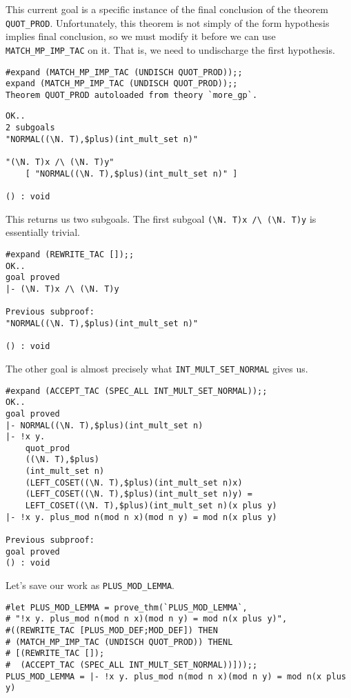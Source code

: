This current goal is a specific instance of the final conclusion of
the theorem {\small\verb+QUOT_PROD+}.  Unfortunately, this theorem is
not simply of the form hypothesis implies final conclusion, so we must
modify it before we can use {\small\verb+MATCH_MP_IMP_TAC+} on it.
That is, we need to undischarge the first hypothesis.
\begin{session}
\begin{verbatim}
#expand (MATCH_MP_IMP_TAC (UNDISCH QUOT_PROD));;
expand (MATCH_MP_IMP_TAC (UNDISCH QUOT_PROD));;
Theorem QUOT_PROD autoloaded from theory `more_gp`.
\end{verbatim}
\mvdots
\begin{verbatim}
OK..
2 subgoals
"NORMAL((\N. T),$plus)(int_mult_set n)"

"(\N. T)x /\ (\N. T)y"
    [ "NORMAL((\N. T),$plus)(int_mult_set n)" ]

() : void
\end{verbatim}
\end{session}

This returns us two subgoals.  The first subgoal 
{\small\verb+(\N. T)x /\ (\N. T)y+} is essentially trivial.
\begin{session}
\begin{verbatim}
#expand (REWRITE_TAC []);;
OK..
goal proved
|- (\N. T)x /\ (\N. T)y

Previous subproof:
"NORMAL((\N. T),$plus)(int_mult_set n)"

() : void
\end{verbatim}
\end{session}
The other goal is almost precisely what
{\small\verb+INT_MULT_SET_NORMAL+} gives us.
\begin{session}
\begin{verbatim}
#expand (ACCEPT_TAC (SPEC_ALL INT_MULT_SET_NORMAL));;
OK..
goal proved
|- NORMAL((\N. T),$plus)(int_mult_set n)
|- !x y.
    quot_prod
    ((\N. T),$plus)
    (int_mult_set n)
    (LEFT_COSET((\N. T),$plus)(int_mult_set n)x)
    (LEFT_COSET((\N. T),$plus)(int_mult_set n)y) =
    LEFT_COSET((\N. T),$plus)(int_mult_set n)(x plus y)
|- !x y. plus_mod n(mod n x)(mod n y) = mod n(x plus y)

Previous subproof:
goal proved
() : void
\end{verbatim}
\end{session}

Let's save our work as {\small\verb+PLUS_MOD_LEMMA+}.
\begin{session}
\begin{verbatim}
#let PLUS_MOD_LEMMA = prove_thm(`PLUS_MOD_LEMMA`,
# "!x y. plus_mod n(mod n x)(mod n y) = mod n(x plus y)",
#((REWRITE_TAC [PLUS_MOD_DEF;MOD_DEF]) THEN
# (MATCH_MP_IMP_TAC (UNDISCH QUOT_PROD)) THENL
# [(REWRITE_TAC []);
#  (ACCEPT_TAC (SPEC_ALL INT_MULT_SET_NORMAL))]));;
PLUS_MOD_LEMMA = |- !x y. plus_mod n(mod n x)(mod n y) = mod n(x plus y)
\end{verbatim}
\end{session}

